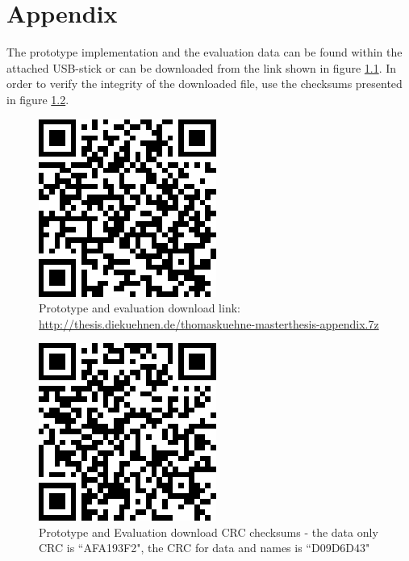 \chapter{Appendix}\label{secAppendixA}

The prototype implementation and the evaluation data can be found within the attached USB-stick or can be downloaded from the link shown in figure \ref{figDownloadLink}. In order to verify the integrity of the downloaded file, use the checksums presented in figure \ref{figDownloadCRC}.

\begin{figure}[!ht]
	\centering
	\includegraphics[scale=0.6, trim=0cm 0cm 0cm 0cm, clip=true]{Images/appendix-download-link.png} 
	\caption{Prototype and evaluation download link: \url{http://thesis.diekuehnen.de/thomaskuehne-masterthesis-appendix.7z}}
	\label{figDownloadLink}
\end{figure}

\begin{figure}[!ht]
	\centering
	\includegraphics[scale=0.6, trim=0cm 0cm 0cm 0cm, clip=true]{Images/appendix-download-crc.png} 
	\caption{Prototype and Evaluation download CRC checksums - the data only CRC is ``AFA193F2", the CRC for data and names is ``D09D6D43"}
	\label{figDownloadCRC}
\end{figure}


